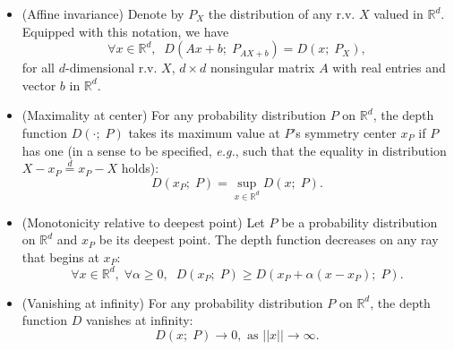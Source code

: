 \documentclass{article}
\numberwithin{equation}{section}
\begin{document}
\begin{itemize}
    \item[$\mathbf{D}_1$] {\sc (Affine invariance)} Denote by $P_X$
        the distribution of any r.v. $X$ valued in $\mathbb{R}^d$.
        Equipped with this notation, we have
        \begin{equation*}\label{eq:AI}
            \forall x\in \mathbb{R}^d,\;\;  D(Ax+b;\;  P_{AX+b})=D(x;\;  P_X),
        \end{equation*}
        for all $d$-dimensional r.v. $X$, $d\times d$ nonsingular
        matrix $A$ with real entries and vector $b$ in $\mathbb{R}^d$.
    \item[$\mathbf{D}_2$] {\sc (Maximality at center)} For any
        probability distribution $P$ on $\mathbb{R}^d$, the depth
        function $D(\cdot;\; P)$ takes its maximum value at $P$'s
        symmetry center $x_P$ if $P$ has one (in a sense to be
            specified, \textit{e.g.}, such that the equality in
        distribution $X-x_P \overset{d}{=} x_P - X$ holds):
        \begin{equation*}
            D(x_P;\;  P)=\sup_{x\in \mathbb{R}^d}D(x;\; P).
        \end{equation*}
    \item[$\mathbf{D}_3$] {\sc (Monotonicity relative to deepest
        point)} Let  $P$ be a probability distribution on
        $\mathbb{R}^d$ and $x_P$ be its deepest point. The depth
        function decreases on any ray that begins at $x_P$:
        \begin{equation*}\label{eq:MoDP}
            \forall x\in \mathbb{R}^d,\; \forall \alpha \geq 0,\;\;
            D(x_P;\; P)\geq D(x_P+\alpha(x-x_P);\; P).
        \end{equation*}

    \item[$\mathbf{D}_4$] {\sc (Vanishing at infinity)} For any
        probability distribution $P$ on $\mathbb{R}^d$, the depth
        function $D$ vanishes at infinity:
        \begin{equation*}\label{eq:Van}
            D(x;\; P)\rightarrow 0, \text{ as } \vert\vert
            x\vert\vert \rightarrow \infty.
        \end{equation*}
\end{itemize}
\end{document}
